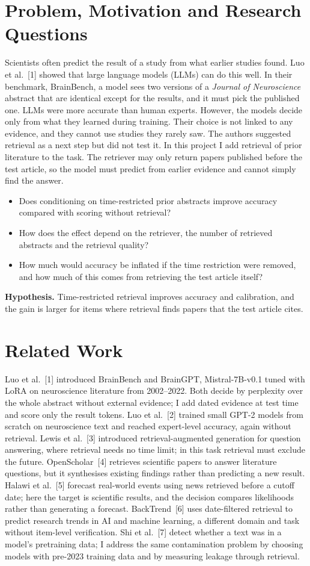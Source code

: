 \documentclass[10pt,a4paper]{article}
\begin{document}
\section{Problem, Motivation and Research Questions}
Scientists often predict the result of a study from what earlier studies found. Luo et al.~[1] showed that large language models (LLMs) can do this well. In their benchmark, BrainBench, a model sees two versions of a \emph{Journal of Neuroscience} abstract that are identical except for the results, and it must pick the published one. LLMs were more accurate than human experts. However, the models decide only from what they learned during training. Their choice is not linked to any evidence, and they cannot use studies they rarely saw. The authors suggested retrieval as a next step but did not test it. In this project I add retrieval of prior literature to the task. The retriever may only return papers published before the test article, so the model must predict from earlier evidence and cannot simply find the answer.
\begin{itemize}
\item[RQ1.] Does conditioning on time-restricted prior abstracts improve accuracy compared with scoring without retrieval?
\item[RQ2.] How does the effect depend on the retriever, the number of retrieved abstracts and the retrieval quality?
\item[RQ3.] How much would accuracy be inflated if the time restriction were removed, and how much of this comes from retrieving the test article itself?
\end{itemize}
\textbf{Hypothesis.} Time-restricted retrieval improves accuracy and calibration, and the gain is larger for items where retrieval finds papers that the test article cites.

\section{Related Work}
Luo et al.~[1] introduced BrainBench and BrainGPT, Mistral-7B-v0.1 tuned with LoRA on neuroscience literature from 2002--2022. Both decide by perplexity over the whole abstract without external evidence; I add dated evidence at test time and score only the result tokens. Luo et al.~[2] trained small GPT-2 models from scratch on neuroscience text and reached expert-level accuracy, again without retrieval. Lewis et al.~[3] introduced retrieval-augmented generation for question answering, where retrieval needs no time limit; in this task retrieval must exclude the future. OpenScholar~[4] retrieves scientific papers to answer literature questions, but it synthesises existing findings rather than predicting a new result. Halawi et al.~[5] forecast real-world events using news retrieved before a cutoff date; here the target is scientific results, and the decision compares likelihoods rather than generating a forecast. BackTrend~[6] uses date-filtered retrieval to predict research trends in AI and machine learning, a different domain and task without item-level verification. Shi et al.~[7] detect whether a text was in a model's pretraining data; I address the same contamination problem by choosing models with pre-2023 training data and by measuring leakage through retrieval.
\end{document}

